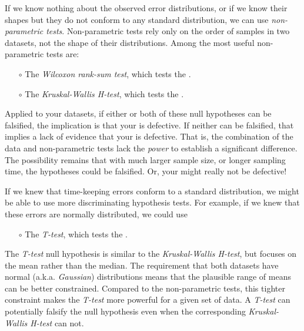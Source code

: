 If we know nothing about the observed error distributions, or if we know their shapes but they do not conform to any standard distribution, we can use \emph{non-parametric tests}.
Non-parametric tests rely only on the order of samples in two datasets, not the shape of their distributions.
Among the most useful non-parametric tests are:
\begin{itemize}
	\item[$\circ$] The \emph{Wilcoxon rank-sum test}, which tests the . 
	\item[$\circ$] The \emph{Kruskal-Wallis H-test}, which tests the  .
\end{itemize}
Applied to your datasets, if either or both of these null hypotheses can be falsified, the implication is that your \rtc is defective.
If neither can be falsified, that implies a lack of evidence that your \rtc is defective. 
That is, the combination of the data and non-parametric tests lack the \emph{power} to establish a significant difference.
The possibility remains that with much larger sample size, or longer sampling time, the hypotheses could be falsified. 
Or, your \rtc might really not be defective!

If we knew that time-keeping errors conform to a standard distribution, we might be able to use more discriminating hypothesis tests.
For example, if we knew that these errors are normally distributed, we could use
\begin{itemize}
	\item[$\circ$] The \emph{T-test}, which tests the  .
\end{itemize}
The \emph{T-test} null hypothesis is similar to the \emph{Kruskal-Wallis H-test}, but focuses on the mean rather than the median.
The requirement that both datasets have normal (a.k.a. \emph{Gaussian}) distributions means that the plausible range of means can be better constrained.
Compared to the non-parametric tests, this tighter constraint makes the \emph{T-test} more powerful for a given set of data. 
A \emph{T-test} can potentially falsify the null hypothesis even when the corresponding \emph{Kruskal-Wallis H-test} can not.

